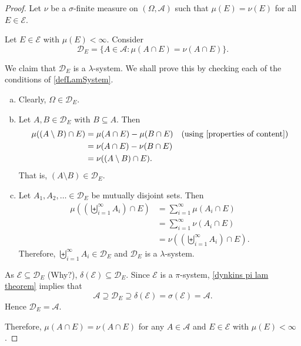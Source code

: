 \begin{proof}
    Let $\nu$ be a $\sigma$-finite measure on $(\Omega,\mathcal{A})$ such that $\mu(E)=\nu(E)$ for all $E\in\mathcal{E}$.
    
    \vspace{1mm}
    Let $E\in\mathcal{E}$ with $\mu(E)<\infty$. Consider
    $$\mathcal{D}_E=\{A\in\mathcal{A}: \mu(A\cap E)=\nu(A\cap E)\}.$$
    
    We claim that $\mathcal{D}_E$ is a $\lambda$-system. We shall prove this by checking each of the conditions of \cref{defLamSystem}.
    
    \begin{enumerate}[(a)]
        \item Clearly, $\Omega\in\mathcal{D}_E$.
        \item Let $A,B\in\mathcal{D}_E$ with $B\subseteq A$. Then
        \begin{align*}
            \mu((A\setminus B)\cap E) &= \mu(A\cap E) - \mu(B\cap E)\quad\text{(using \cref{properties of content})} \\
            &= \nu(A\cap E) - \nu(B\cap E) \\
            &= \nu((A\setminus B)\cap E).
        \end{align*}
        That is, $(A\setminus B)\in\mathcal{D}_E$.
        \item Let $A_1,A_2,\ldots\in\mathcal{D}_E$ be mutually disjoint sets. Then
        \begin{align*}
            \mu\left(\left(\biguplus_{i=1}^\infty A_i\right)\cap E\right) &= \sum_{i=1}^\infty \mu(A_i\cap E) \\
            &= \sum_{i=1}^\infty\nu(A_i\cap E) \\
            &= \nu\left(\left(\biguplus_{i=1}^\infty A_i\right)\cap E\right).
        \end{align*}
        Therefore, $\biguplus_{i=1}^\infty A_i\in\mathcal{D}_E$ and $\mathcal{D}_E$ is a $\lambda$-system.
    \end{enumerate}
    As $\mathcal{E}\subseteq\mathcal{D}_E$ (Why?), $\delta(\mathcal{E})\subseteq\mathcal{D}_E$. Since $\mathcal{E}$ is a $\pi$-system, \cref{dynkins pi lam theorem} implies that
    $$\mathcal{A}\supseteq\mathcal{D}_E\supseteq\delta(\mathcal{E})=\sigma(\mathcal{E})=\mathcal{A}.$$
    Hence $\mathcal{D}_E=\mathcal{A}$.
    
    Therefore, $\mu(A\cap E)=\nu(A\cap E)$ for any $A\in\mathcal{A}$ and $E\in\mathcal{E}$ with $\mu(E)<\infty$.
    

\end{proof}
